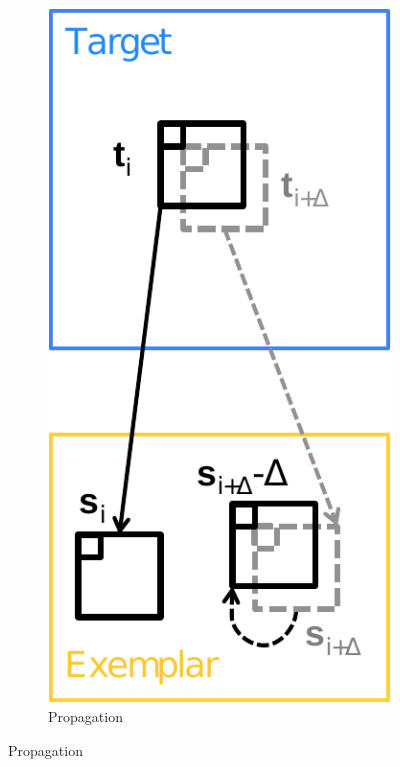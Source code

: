 \begin{figure}[ht]
\centering
	\begin{subfigure}[t]{0.155\textwidth}
		\includegraphics[width=\textwidth]{figures/propagation_text2}
		\caption{Propagation}

\end{subfigure}
\end{figure}
